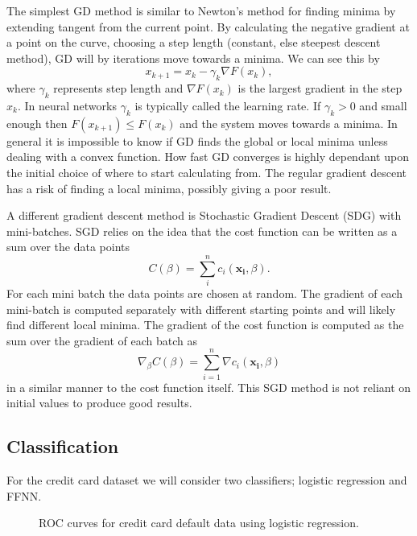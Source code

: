\documentclass[%
 reprint,
nofootinbib,
 amsmath,amssymb,
 aps,
]{revtex4-2}
\begin{document}
The simplest GD method is similar to Newton's method for finding minima by extending tangent from the current point. By calculating the negative gradient at a point on the curve, choosing a step length (constant, else steepest descent method),  GD will by iterations move towards a minima. We can see this by
%
\begin{equation}
    x_{k+1} = x_{k} - \gamma_{k}\nabla F(x_k),
\end{equation}
%
where $\gamma_k$ represents step length and $\nabla F(x_k)$ is the largest gradient in the step $x_k$. In neural
networks $\gamma_k$ is typically called the learning rate. If $\gamma_k > 0$ and small enough then $F(x_{k+1}) \leq F(x_k)$ and the system moves towards a minima. In general it is impossible to know if GD finds the global or local minima unless dealing with a convex function. How fast GD converges is highly dependant upon the initial choice of where to start calculating from. The regular gradient descent has a risk of finding a local minima, possibly giving a poor result.

A different gradient descent method is Stochastic Gradient Descent (SDG) with mini-batches. SGD relies on the idea that the cost function can be written as a sum over the data points
%
\begin{equation}
    C(\beta) = \sum_{i}^{n} c_i(\boldsymbol{x_i}, \beta).
\end{equation}
%
For each mini batch the data points are chosen at random. The gradient of each mini-batch is computed separately with different starting points and will likely find different local minima. The gradient of the cost function is computed as the sum over the gradient of each batch as
%
\begin{equation}
    \nabla_{\beta} C(\beta) = \sum_{i=1}^{n} \nabla c_i(\boldsymbol{x_i}, \beta)
\end{equation}
%
 in a similar manner to the cost function itself. This SGD method is not reliant on initial values to produce good results.

\subsection{Classification}
For the credit card dataset we will consider two classifiers; logistic regression and FFNN.

\begin{figure}[h!]
\caption{ROC curves for credit card default data using logistic regression.}
\label{fig:roc_curves_logreg}
\end{figure}
\end{document}
